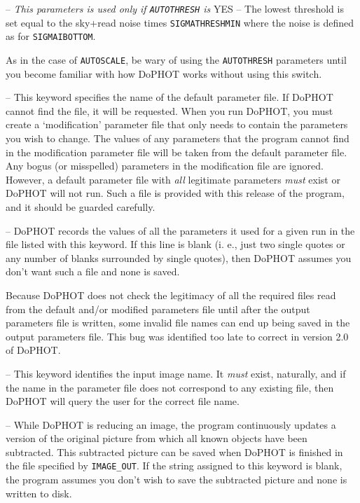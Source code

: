  -- 
{\it This parameters is used
only if {\tt AUTOTHRESH} is} YES -- 
The lowest threshold is set equal
to the sky+read noise times {\tt SIGMATHRESHMIN} where the noise
is defined as for {\tt SIGMAIBOTTOM}.

\noindent As in the case of {\tt AUTOSCALE}, be wary of using
the {\tt AUTOTHRESH} parameters until you become familiar
with how DoPHOT works without using this switch.

 -- This keyword specifies 
the name of the default parameter file.  If DoPHOT cannot find
the file, it will be requested.  When you run DoPHOT, you must
create a `modification' parameter file that only needs to contain
the parameters you wish to change.  The values of any parameters that the
program cannot find in the modification parameter file will be
taken from the default parameter file.  Any bogus (or misspelled)
parameters in the modification file are ignored.  However, a default
parameter file with 
{\it all} legitimate parameters {\it must} exist or DoPHOT will not
run.  Such a file is provided with this release of the program, and
it should be guarded carefully.

 -- DoPHOT records the values of all
the parameters it used for a given run in the file listed with
this keyword.  If this line is blank (i. e., just two single
quotes or
any number of blanks surrounded by single quotes),
then DoPHOT assumes you
don't want such a file and none is  saved.

Because DoPHOT does not check the legitimacy of all the required
files read from the default and/or modified parameters file until
after the output parameters file is written, some
invalid file names can end up being saved in the output parameters file.
This bug was identified too late to correct in version 2.0 of 
DoPHOT.

 -- This keyword identifies the input
image name.  It {\it must} exist, naturally, and if the name
in the parameter file does not correspond to any existing file, 
then DoPHOT will query the user for the correct file name.

 -- While DoPHOT is reducing an image, the
program continuously 
updates a version of the original picture from which all known objects
have been subtracted.  This subtracted picture can be saved when
DoPHOT is finished in the file specified by {\tt IMAGE\_OUT}.
If the string assigned to this keyword is blank,
the program assumes you don't wish to save the subtracted 
picture and none is written to disk.

